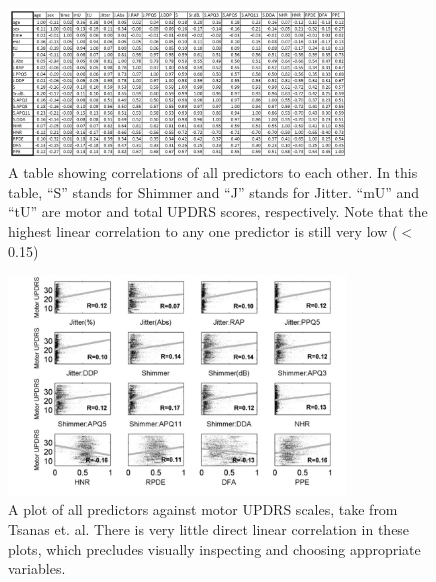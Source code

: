 \documentclass{report}
\begin{document}

\begin{figure}[th]

\centering

\includegraphics[width = 0.8\textwidth]{CorTable}

\caption{A table showing correlations of all predictors to each other. In this table, ``S'' stands for Shimmer and ``J'' stands for Jitter. ``mU'' and ``tU'' are motor and total UPDRS scores, respectively.
Note that the highest linear correlation to any one predictor is still very low ($<$0.15)}

\end{figure}



\begin{figure}[h]

\centering

\includegraphics[width=0.8\textwidth]{regressionplotpredictors}

\caption{A plot of all predictors against motor UPDRS scales, take from Tsanas et. al.\cite{main} There is very little direct linear correlation in these plots, which precludes visually inspecting and choosing
appropriate variables.}

\end{figure}

\end{document}

